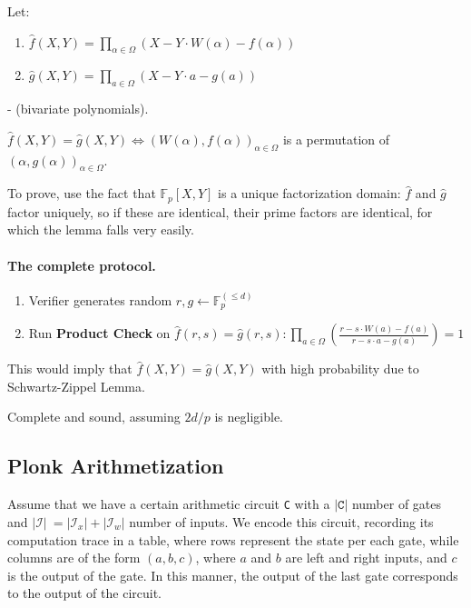 \documentclass[../lecture-notes.tex]{subfiles}
\begin{document}
\begin{lemma}
Let:
    \begin{enumerate}
        \item \(\hat{f}(X,Y) = \prod_{\alpha \in \Omega} (X - Y \cdot W(\alpha) - f(\alpha))\)
        \item \(\hat{g}(X,Y) = \prod_{a \in \Omega} (X - Y \cdot a - g(a))\)
    \end{enumerate}
- (bivariate polynomials).  

\(\hat{f}(X,Y) = \hat{g}(X,Y) \iff \left( W(\alpha), f(\alpha) \right)_{\alpha \in \Omega}\) is a permutation of \(\left( \alpha, g(\alpha) \right)_{\alpha \in \Omega}\).

To prove, use the fact that \(\mathbb{F}_p[X,Y]\) is a unique factorization domain: \(\hat{f}\) and \(\hat{g}\) factor uniquely, so if these are identical, their prime factors are identical, for which the lemma falls very easily.
\end{lemma}

\paragraph{The complete protocol.}
\begin{enumerate}
    \item Verifier generates random \(r, g \leftarrow\mathbb{F}_p^{(\leq d)} \)
    \item Run \textbf{Product Check} on \(\hat{f}(r, s) = \hat{g}(r, s): \prod_{a \in \Omega} \left( \frac{r - s \cdot W(a) - f(a)}{r - s \cdot a - g(a)} \right) = 1\)
\end{enumerate}

This would imply that \(\hat{f}(X,Y) = \hat{g}(X,Y)\) with high probability due to Schwartz-Zippel Lemma.

\begin{remark}
Complete and sound, assuming \(2d/p\) is negligible.
\end{remark}

\subsection{Plonk Arithmetization}

Assume that we have a certain arithmetic circuit \texttt{C} with a \(|\texttt{C}|\) number of gates and \(|\mathcal{I}|\ = |\mathcal{I}_x| + |\mathcal{I}_w|\) number of inputs. We encode this circuit, recording its computation trace in a table, where rows represent the state per each gate, while columns are of the form \((a, b, c)\), where \(a\) and \(b\) are left and right inputs, and \(c\) is the output of the gate. In this manner, the output of the last gate corresponds to the output of the circuit.
\end{document}
